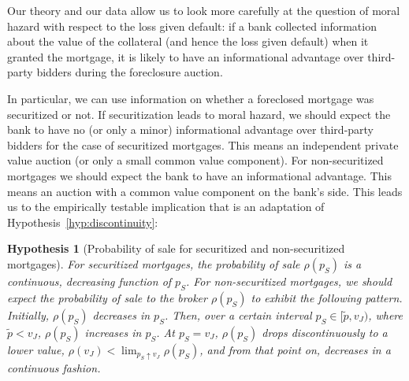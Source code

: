 \documentclass[11pt,twopage]{article}
\newtheorem{conjecture}{Hypothesis}
{\bf}{\it}
\begin{document}
Our theory and our data allow us to look more carefully at the
question of moral hazard with respect to the loss given default: if a
bank collected information about the value of the collateral (and hence
the loss given default) when it granted the mortgage, it is likely to
have an informational advantage over third-party bidders during the
foreclosure auction.

In particular, we can use information on whether a foreclosed mortgage
was securitized or not. If securitization leads to moral hazard, we
should expect the bank to have no (or only a minor) informational
advantage over third-party bidders for the case of securitized
mortgages. This means an independent private value auction (or only a
small common value component). For non-securitized mortgages we should
expect the bank to have an informational advantage. This means an
auction with a common value component on the bank's side.  This leads
us to the empirically testable implication that is an adaptation of
Hypothesis~\ref{hyp:discontinuity}:

\begin{conjecture}[Probability of sale for securitized and non-securitized mortgages]\label{hyp:discontinuity-sec-nonsec}
  For securitized mortgages, the probability of sale $\rho(p_S)$ is a
  continuous, decreasing function of $p_S$. For non-securitized
  mortgages, we should expect the probability of sale to the broker
  $\rho(p_S)$ to exhibit the following pattern. Initially, $\rho(p_S)$
  decreases in $p_S$. Then, over a certain interval $p_S \in [\tilde
  p, v_J)$, where $\tilde p < v_J$, $\rho(p_S)$ increases in $p_S$. At
  $p_S = v_J$, $\rho(p_S)$ drops discontinuously to a lower value,
  $\rho(v_J)<\lim_{p_S \uparrow v_J} \rho(p_S)$, and from that point
  on, decreases in a continuous fashion.
\end{conjecture}
\end{document}
